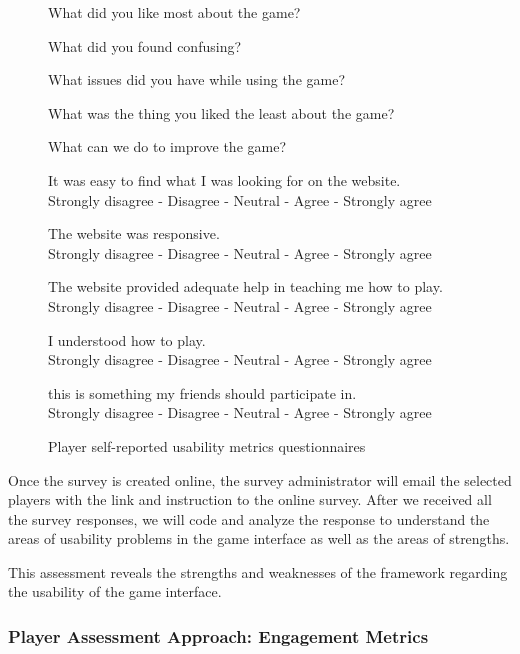 \documentclass[11pt,oneside]{book}
\begin{document}
\begin{figure}[ht!]
\begin{mybox}
\begin{compactenum}
\item What did you like most about the game?
\item What did you found confusing?
\item What issues did you have while using the game?
\item What was the thing you liked the least about the game?
\item What can we do to improve the game?
\item It was easy to find what I was looking for on the website.  \\
	Strongly disagree  -  Disagree  -  Neutral  -  Agree  -  Strongly agree
\item The website was responsive. \\
	Strongly disagree  -  Disagree  -  Neutral  -  Agree  -  Strongly agree
\item The website provided adequate help in teaching me how to play. \\
	Strongly disagree  -  Disagree  -  Neutral  -  Agree  -  Strongly agree
\item I understood how to play. \\
	Strongly disagree  -  Disagree  -  Neutral  -  Agree  -  Strongly agree
\item this is something my friends should participate in. \\
	Strongly disagree  -  Disagree  -  Neutral  -  Agree  -  Strongly agree
\end{compactenum}
\end{mybox}
\caption{Player self-reported usability metrics questionnaires}
\label{fig:usability-metrics}  
\end{figure}

Once the survey is created online, the survey administrator will email the selected players with the link and instruction to the online survey. 
After we received all the survey responses, we will code and analyze the response to understand the areas of usability problems in the game interface as well as the areas of strengths.

This assessment reveals the strengths and weaknesses of the framework regarding the usability of the game interface.
 
\subsubsection{Player Assessment Approach: Engagement Metrics}
\label{Engagement metrics}
\end{document}
